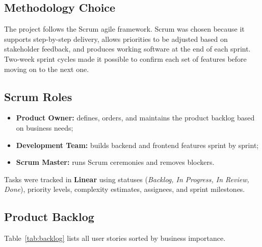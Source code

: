 \documentclass[12pt,a4paper]{report}
\begin{document}
\subsection{Methodology Choice}

The project follows the Scrum agile framework.
Scrum was chosen because it supports step-by-step delivery, allows priorities to be
adjusted based on stakeholder feedback, and produces working software at the end of
each sprint.
Two-week sprint cycles made it possible to confirm each set of features before
moving on to the next one.

\subsection{Scrum Roles}

\begin{itemize}
  \item \textbf{Product Owner:} defines, orders, and maintains the product backlog
        based on business needs;
  \item \textbf{Development Team:} builds backend and frontend features sprint by
        sprint;
  \item \textbf{Scrum Master:} runs Scrum ceremonies and removes blockers.
\end{itemize}

Tasks were tracked in \textbf{Linear} using statuses (\textit{Backlog, In Progress,
In Review, Done}), priority levels, complexity estimates, assignees, and sprint
milestones.

\subsection{Product Backlog}

Table~\ref{tab:backlog} lists all user stories sorted by business importance.
\end{document}
